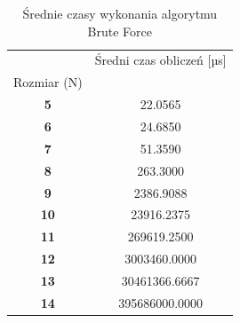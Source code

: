 \begin{table}
\caption{Średnie czasy wykonania algorytmu Brute Force}
\label{tab:bf_times}
\begin{tabular}{|c|c|}
\toprule
 & Średni czas obliczeń [µs] \\
Rozmiar (N) &  \\
\midrule
\textbf{5} & 22.0565 \\
\textbf{6} & 24.6850 \\
\textbf{7} & 51.3590 \\
\textbf{8} & 263.3000 \\
\textbf{9} & 2386.9088 \\
\textbf{10} & 23916.2375 \\
\textbf{11} & 269619.2500 \\
\textbf{12} & 3003460.0000 \\
\textbf{13} & 30461366.6667 \\
\textbf{14} & 395686000.0000 \\
\bottomrule
\end{tabular}
\end{table}
